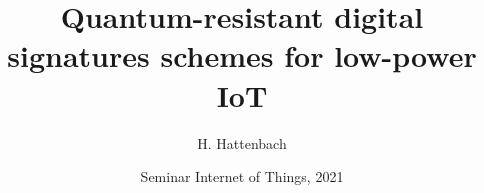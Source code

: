 
\usepackage[utf8x]{inputenc}    
\usepackage[english]{babel}    

  



\title[Quantum-resistant signatures for IoT] %
{Quantum-resistant digital signatures schemes for low-power IoT}

\author %
{H. Hattenbach}


\date[] %
{Seminar Internet of Things, 2021}

\subject{Seminar Internet of Things}

\renewcommand{\footlinetext}{\insertshortinstitute, \insertshorttitle, \insertshortdate}

